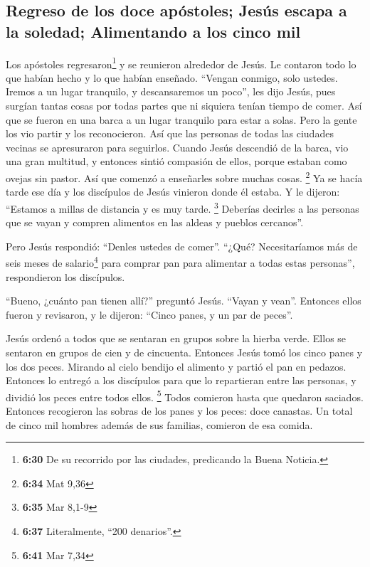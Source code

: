 \hypertarget{regreso-de-los-doce-apuxf3stoles-jesuxfas-escapa-a-la-soledad-alimentando-a-los-cinco-mil}{%
\subsection{Regreso de los doce apóstoles; Jesús escapa a la soledad;
Alimentando a los cinco
mil}\label{regreso-de-los-doce-apuxf3stoles-jesuxfas-escapa-a-la-soledad-alimentando-a-los-cinco-mil}}

 Los apóstoles regresaron\footnote{\textbf{6:30} De su
  recorrido por las ciudades, predicando la Buena Noticia.} y se
reunieron alrededor de Jesús. Le contaron todo lo que habían hecho y lo
que habían enseñado.  ``Vengan conmigo, solo ustedes.
Iremos a un lugar tranquilo, y descansaremos un poco'', les dijo Jesús,
pues surgían tantas cosas por todas partes que ni siquiera tenían tiempo
de comer.  Así que se fueron en una barca a un lugar
tranquilo para estar a solas.  Pero la gente los vio
partir y los reconocieron. Así que las personas de todas las ciudades
vecinas se apresuraron para seguirlos.  Cuando Jesús
descendió de la barca, vio una gran multitud, y entonces sintió
compasión de ellos, porque estaban como ovejas sin pastor. Así que
comenzó a enseñarles sobre muchas cosas. \footnote{\textbf{6:34} Mat
  9,36}  Ya se hacía tarde ese día y los discípulos de
Jesús vinieron donde él estaba. Y le dijeron: ``Estamos a millas de
distancia y es muy tarde. \footnote{\textbf{6:35} Mar 8,1-9}
 Deberías decirles a las personas que se vayan y compren
alimentos en las aldeas y pueblos cercanos''.

 Pero Jesús respondió: ``Denles ustedes de comer''.
``¿Qué? Necesitaríamos más de seis meses de salario\footnote{\textbf{6:37}
  Literalmente, ``200 denarios''.} para comprar pan para alimentar a
todas estas personas'', respondieron los discípulos.

 ``Bueno, ¿cuánto pan tienen allí?'' preguntó Jesús.
``Vayan y vean''. Entonces ellos fueron y revisaron, y le dijeron:
``Cinco panes, y un par de peces''.

 Jesús ordenó a todos que se sentaran en grupos sobre la
hierba verde.  Ellos se sentaron en grupos de cien y de
cincuenta.  Entonces Jesús tomó los cinco panes y los dos
peces. Mirando al cielo bendijo el alimento y partió el pan en pedazos.
Entonces lo entregó a los discípulos para que lo repartieran entre las
personas, y dividió los peces entre todos ellos. \footnote{\textbf{6:41}
  Mar 7,34}  Todos comieron hasta que quedaron saciados.
 Entonces recogieron las sobras de los panes y los peces:
doce canastas.  Un total de cinco mil hombres además de
sus familias, comieron de esa comida.

